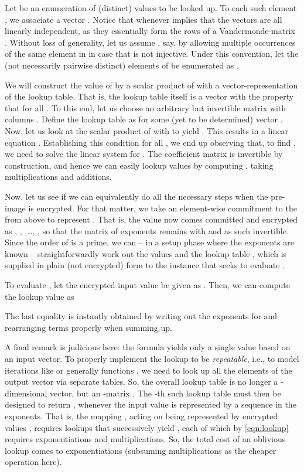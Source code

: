 \documentclass{llncs}
\begin{document}
Let  be an enumeration of (distinct)
values to be looked up. To each such element , we associate a vector
. Notice that
 whenever  implies that the vectors  are all linearly independent, as they essentially form
the rows of a Vandermonde-matrix . Without loss of generality, let us
assume , say, by allowing multiple occurrences of the same
element in  in case that  is not injective. Under this convention, let
the (not necessarily pairwise distinct) elements of  be enumerated as
.

We will construct the value of  by a scalar product of 
with a vector-representation of the lookup table. That is, the lookup table
itself is a vector  with the property that  for all . To this end, let us choose an
arbitrary but invertible matrix  with columns . Define the lookup table as  for some (yet to be determined) vector . Now, let us look at the scalar product of
 with  to yield . This
results in a linear equation . Establishing this condition for all , we end up
observing that, to find , we need to solve the linear system
 for . The coefficient matrix  is invertible by
construction, and hence we can easily lookup values  by computing
, taking  multiplications and
additions.

Now, let us see if we can equivalently do all the necessary steps when the
pre-image is encrypted. For that matter, we take an element-wise commitment
to the  from above to represent . That is, the value  now
comes committed and encrypted as ,
, ,\ldots,
, so that the matrix of exponents
remains  with  and as such
invertible. Since the order of  is a prime, we can -- in a setup phase
where the exponents are known -- straightforwardly work out the values
 and the lookup table , which
is supplied in plain (not encrypted) form to the instance that seeks to
evaluate .

To evaluate , let the encrypted input value  be given as . Then, we can compute the lookup value  as


The last equality is instantly obtained by writing out the exponents for
 and rearranging terms properly when summing up.

A final remark is judicious here: the formula yields only a single value
based on an input vector. To properly implement the lookup to be
\emph{repeatable}, i.e., to model iterations like 
or generally functions , we need to look up all the elements of the
output vector via separate tables. So, the overall lookup table is no longer
a -dimensional vector, but an -matrix . The -th such lookup table  must
then be designed to return , whenever the input value  is
represented by a sequence  in the exponents. That is,
the mapping , acting on  being represented by encrypted values
, requires  lookups that successively
yield , each of which by \eqref{eqn:lookup}
requires  exponentiations and multiplications. So, the total cost of an
oblivious lookup comes to  exponentiations (subsuming multiplications
as the cheaper operation here).
\end{document}
